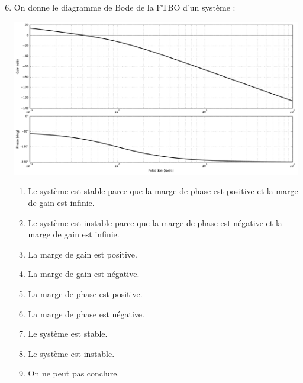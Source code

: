 \documentclass[10pt,fleqn]{article} %
\begin{document}
\begin{multicols}{2}
\begin{enumerate}
\setcounter{enumi}{5}
\item On donne le diagramme de Bode de la FTBO d'un système : 
\begin{center}
\includegraphics[width=\linewidth]{images/img_04}
\end{center}
\begin{enumerate}
\item Le système est stable parce que la marge de phase est positive et la marge de gain est infinie.
\item Le système est instable parce que la marge de phase est négative et la marge de gain est infinie.
\item La marge de gain est positive. %
\item La marge de gain est négative. %
\item La marge de phase est positive. %
\item La marge de phase est négative.
\item Le système est stable. %
\item Le système est instable.
\item On ne peut pas conclure. %
\end{enumerate}
\end{enumerate}


\end{multicols}

\fi
\end{document}
